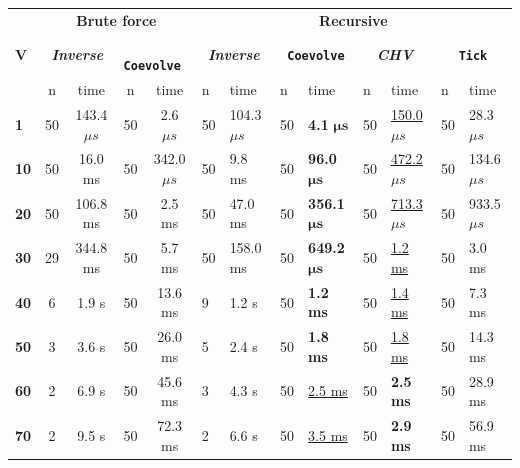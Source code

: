 \documentclass{juliacon}
\begin{document}
\begin{table}
\centering
\begin{tabular}{lccccllllllll}
\toprule
 & \multicolumn{4}{c}{\textbf{ Brute force }} & \multicolumn{8}{c}{\textbf{Recursive}} \\
\textbf{ V } & \multicolumn{2}{c}{\textbf{ \textit{Inverse} }} & \multicolumn{2}{c}{\textbf{\texttt{ Coevolve }}} & \multicolumn{2}{c}{\textbf{ \textit{Inverse} }} & \multicolumn{2}{c}{\textbf{\texttt{ Coevolve }}} & \multicolumn{2}{c}{\textbf{\textit{ CHV }}} & \multicolumn{2}{c}{\textbf{ \texttt{Tick} }} \\
            & n  & time              & n  & time              & n  & time              & n  & time                            & n  & time                          & n             & time              \\
\textbf{1}  & 50 & 143.4 \( \mu s \) & 50 & 2.6 \( \mu s \)   & 50 & 104.3 \( \mu s \) & 50 & \textbf{4.1} \( \bm{\mu s} \)   & 50 & \underline{150.0 \( \mu s \)} & 50            & 28.3 \( \mu s \)  \\
\textbf{10} & 50 & 16.0 ms           & 50 & 342.0 \( \mu s \) & 50 & 9.8 ms            & 50 & \textbf{96.0} \( \bm{\mu s} \)  & 50 & \underline{472.2 \( \mu s \)} & 50            & 134.6 \( \mu s \) \\
\textbf{20} & 50 & 106.8 ms          & 50 & 2.5 ms            & 50 & 47.0 ms           & 50 & \textbf{356.1} \( \bm{\mu s} \) & 50 & \underline{713.3 \( \mu s \)} & 50            & 933.5 \( \mu s \) \\
\textbf{30} & 29 & 344.8 ms          & 50 & 5.7 ms            & 50 & 158.0 ms          & 50 & \textbf{649.2} \( \bm{\mu s} \) & 50 & \underline{1.2 ms}            & 50            & 3.0 ms            \\
\textbf{40} & 6  & 1.9 s             & 50 & 13.6 ms           & 9  & 1.2 s             & 50 & \textbf{1.2 ms}                 & 50 & \underline{1.4 ms}            & 50            & 7.3 ms            \\
\textbf{50} & 3  & 3.6 s             & 50 & 26.0 ms           & 5  & 2.4 s             & 50 & \textbf{1.8 ms}                 & 50 & \underline{1.8 ms}            & 50            & 14.3 ms           \\
\textbf{60} & 2  & 6.9 s             & 50 & 45.6 ms           & 3  & 4.3 s             & 50 & \underline{2.5 ms}              & 50 & \textbf{2.5  ms}              & 50            & 28.9 ms           \\
\textbf{70} & 2  & 9.5 s             & 50 & 72.3 ms           & 2  & 6.6 s             & 50 & \underline{3.5 ms}              & 50 & \textbf{2.9 ms}               & 50            & 56.9 ms           \\

\end{tabular}
\end{table}
\end{document}
